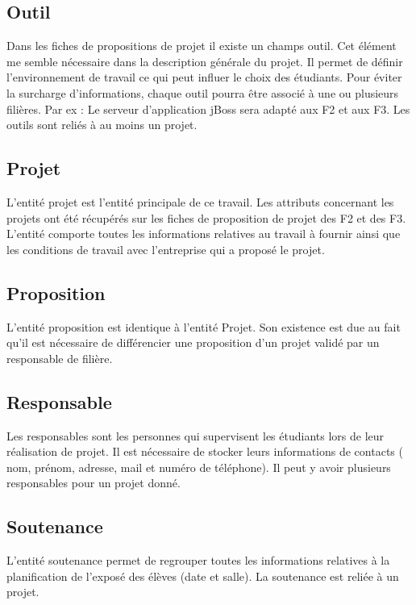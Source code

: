 \documentclass[a4paper,11pt]{report}
\begin{document}
\subsection{Outil}
\normalsize{
Dans les fiches de propositions de projet il existe un champs outil. Cet élément me semble nécessaire dans la description générale du projet. Il permet de définir l'environnement de travail ce qui peut influer le choix des étudiants. Pour éviter la surcharge d'informations, chaque outil pourra être associé à une ou plusieurs filières. Par ex : Le serveur d'application jBoss sera adapté aux F2 et aux F3. Les outils sont reliés à au moins un projet.
}

\subsection{Projet}
\normalsize{
L'entité projet est l'entité principale de ce travail. Les attributs concernant les projets ont été récupérés sur les fiches de proposition de projet des F2 et des F3. L'entité comporte toutes les informations relatives au travail à fournir ainsi que les conditions de travail avec l'entreprise qui a proposé le projet.
}

\subsection{Proposition}
\normalsize{
L'entité proposition est identique à l'entité Projet. Son existence est due au fait qu'il est nécessaire de différencier une proposition d'un projet validé par un responsable de filière.
}

\subsection{Responsable}
\normalsize{
Les responsables sont les personnes qui supervisent les étudiants lors de leur réalisation de projet. Il est nécessaire de stocker leurs informations de contacts ( nom, prénom, adresse, mail et numéro de téléphone). Il peut y avoir plusieurs responsables pour un projet donné.
}

\subsection{Soutenance}
\normalsize{
L'entité soutenance permet de regrouper toutes les informations relatives à la planification de l'exposé des élèves (date et salle). La soutenance est reliée à un projet. 
}
\end{document}

